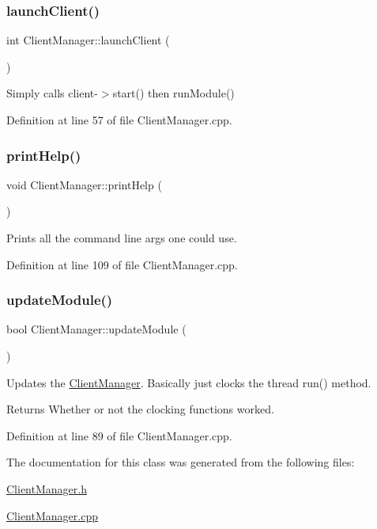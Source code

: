 \subsubsection{\texorpdfstring{launch\+Client()}{launchClient()}}
{\footnotesize\ttfamily int Client\+Manager\+::launch\+Client (\begin{DoxyParamCaption}{ }\end{DoxyParamCaption})}

Simply calls client-\/$>$start() then run\+Module() 

Definition at line 57 of file Client\+Manager.\+cpp.

\hypertarget{classocra__recipes_1_1ClientManager_aa935699ac8fe135a066ce69f7ebc6d0d}{}\label{classocra__recipes_1_1ClientManager_aa935699ac8fe135a066ce69f7ebc6d0d} 
\subsubsection{\texorpdfstring{print\+Help()}{printHelp()}}
{\footnotesize\ttfamily void Client\+Manager\+::print\+Help (\begin{DoxyParamCaption}{ }\end{DoxyParamCaption})}

Prints all the command line args one could use. 

Definition at line 109 of file Client\+Manager.\+cpp.

\hypertarget{classocra__recipes_1_1ClientManager_a2fb40c4d2440367c4f66ad5815e6b1f8}{}\label{classocra__recipes_1_1ClientManager_a2fb40c4d2440367c4f66ad5815e6b1f8} 
\subsubsection{\texorpdfstring{update\+Module()}{updateModule()}}
{\footnotesize\ttfamily bool Client\+Manager\+::update\+Module (\begin{DoxyParamCaption}{ }\end{DoxyParamCaption})}

Updates the \hyperlink{classocra__recipes_1_1ClientManager}{Client\+Manager}. Basically just clocks the thread run() method. \begin{DoxyReturn}{Returns}
Whether or not the clocking functions worked. 
\end{DoxyReturn}


Definition at line 89 of file Client\+Manager.\+cpp.



The documentation for this class was generated from the following files\+:\begin{DoxyCompactItemize}
\item 
\hyperlink{ClientManager_8h}{Client\+Manager.\+h}\item 
\hyperlink{ClientManager_8cpp}{Client\+Manager.\+cpp}\end{DoxyCompactItemize}
